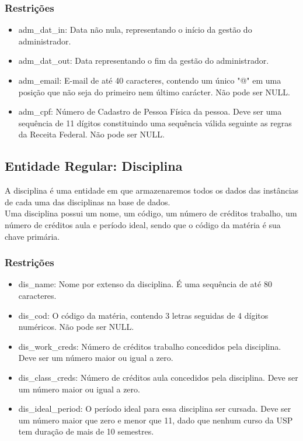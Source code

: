 \documentclass{article}
\begin{document}
  	    \subsubsection{Restrições}
  	        \begin{itemize}
  	            \item adm\_dat\_in: Data não nula, representando o início da gestão do administrador.
  	            \item adm\_dat\_out: Data representando o fim da gestão do administrador.
  	            \item adm\_email: E-mail de até 40 caracteres, contendo um único "@" em uma posição que não seja do primeiro nem último carácter. Não pode ser NULL.
  	            \item adm\_cpf: Número de Cadastro de Pessoa Física da pessoa. Deve ser uma sequência de 11 dígitos constituindo uma sequência válida seguinte as regras da Receita Federal. Não pode ser NULL.
  	        \end{itemize}
  	        
  	\subsection{Entidade Regular: Disciplina}
  	    \quad A disciplina é uma entidade em que armazenaremos todos os dados das instâncias de cada uma das disciplinas na base de dados. \\
  	    \null \quad Uma disciplina possui um nome, um código, um número de créditos trabalho, um número de créditos aula e período ideal, sendo que o código da matéria é sua chave primária.
  	    \subsubsection{Restrições}
  	        \begin{itemize}
  		        \item dis\_name: Nome por extenso da disciplina. É uma sequência de até 80 caracteres.
  		        \item dis\_cod: O código da matéria, contendo 3 letras seguidas de 4 dígitos numéricos. Não pode ser NULL.
  		        \item dis\_work\_creds: Número de créditos trabalho concedidos pela disciplina. Deve ser um número maior ou igual a zero.
  		        \item dis\_class\_creds: Número de créditos aula concedidos pela disciplina. Deve ser um número maior ou igual a zero.
  		        \item dis\_ideal\_period: O período ideal para essa disciplina ser cursada. Deve ser um número maior que zero e menor que 11, dado que nenhum curso da USP tem duração de mais de 10 semestres.
  		    \end{itemize}
  		    
\end{document}
